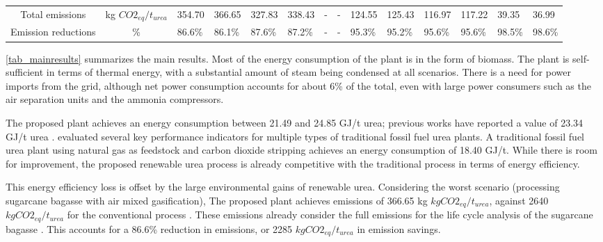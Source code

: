 \documentclass[a4paper, titlepage]{article}
\begin{document}
\begin{table}
\begin{tabular}{|| c | c | C{0.8cm} | C{0.8cm} | C{0.8cm} | C{0.8cm}| C{0.8cm} | C{0.8cm} |  C{0.8cm} | C{0.8cm}| C{0.8cm} | C{0.8cm} | C{0.8cm} |  C{0.8cm} ||}
        Total emissions                     & kg $CO2_{eq}/t_{urea}$ & 354.70                                         & 366.65                                       & 327.83                                     & 338.43                                   & -                                      & -                                        & 124.55  & 125.43  & 116.97  & 117.22  & 39.35   & 36.99   \\

        Emission reductions\footnotemark[1] & \%                     & 86.6\%                                         & 86.1\%                                       & 87.6\%                                     & 87.2\%                                   & -                                      & -                                        & 95.3\%  & 95.2\%  & 95.6\%  & 95.6\%  & 98.5\%  & 98.6\%  \\
        \hline
    \end{tabular}

\end{table}

\autoref{tab_mainresults} summarizes the main results. Most of the energy consumption of the plant is in the form of
biomass. The plant is self-sufficient in terms of thermal energy, with a substantial amount of steam being condensed
at all scenarios.
There is a need for power imports from the grid, although net power consumption accounts for about 6\% of the total,
even with large power consumers such as the air separation units and the ammonia compressors.

The proposed plant achieves an energy consumption between 21.49 and 24.85 GJ/t urea; previous works have reported a
value of 23.34 GJ/t urea \cite{zhangTechnoeconomicComparison1002021}. \textcite{chenPerformanceComparisonUrea2022}
evaluated several key performance indicators for multiple types of traditional fossil fuel urea plants. A traditional
fossil fuel urea plant using natural gas as feedstock and carbon dioxide stripping achieves an energy consumption of
18.40 GJ/t. While there is room for improvement, the proposed renewable urea process is already competitive with the
traditional process in terms of energy efficiency.

This energy efficiency loss is offset by the large environmental gains of renewable urea. Considering the worst scenario
(processing sugarcane bagasse with air mixed gasification), The proposed plant achieves emissions of 366.65 kg $kg
    CO2_{eq} / t_{urea}$, against 2640 $kg CO2_{eq} / t_{urea}$ for the conventional process
\cite{chenPerformanceComparisonUrea2022}. These emissions already consider the full emissions for the life cycle
analysis of the sugarcane bagasse \cite{jonkerEconomicPerformanceGHG2019}. This accounts for a 86.6\% reduction in
emissions, or 2285 $kg CO2_{eq} / t_{urea}$ in emission savings.
\end{document}

